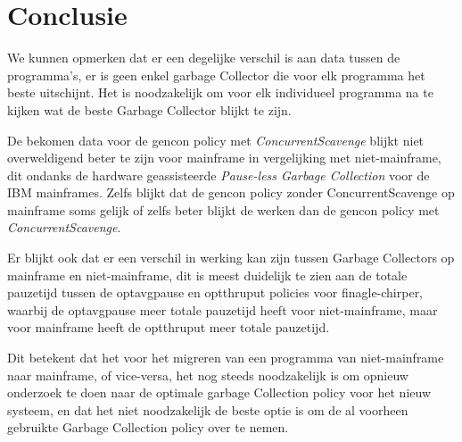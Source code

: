 
\chapter{Conclusie}%
\label{ch:conclusie}





We kunnen opmerken dat er een degelijke verschil is aan data tussen de programma's, er is geen enkel garbage Collector die voor elk programma het beste uitschijnt.
Het is noodzakelijk om voor elk individueel programma na te kijken wat de beste Garbage Collector blijkt te zijn.


De bekomen data voor de gencon policy met \textit{ConcurrentScavenge} blijkt niet overweldigend beter te zijn voor mainframe in vergelijking met niet-mainframe, dit ondanks de hardware geassisteerde \textit{Pause-less Garbage Collection} voor de IBM mainframes.
Zelfs blijkt dat de gencon policy zonder ConcurrentScavenge op mainframe soms gelijk of zelfs beter blijkt de werken dan de gencon policy met \textit{ConcurrentScavenge}.


Er blijkt ook dat er een verschil in werking kan zijn tussen Garbage Collectors op mainframe en niet-mainframe, dit is meest duidelijk te zien aan de totale pauzetijd tussen de optavgpause en optthruput policies voor finagle-chirper, waarbij de optavgpause meer totale pauzetijd heeft voor niet-mainframe, maar voor mainframe heeft de optthruput meer totale pauzetijd.

Dit betekent dat het voor het migreren van een programma van niet-mainframe naar mainframe, of vice-versa, het nog steeds noodzakelijk is om opnieuw onderzoek te doen naar de optimale garbage Collection policy voor het nieuw systeem, en dat het niet noodzakelijk de beste optie is om de al voorheen gebruikte Garbage Collection policy over te nemen.